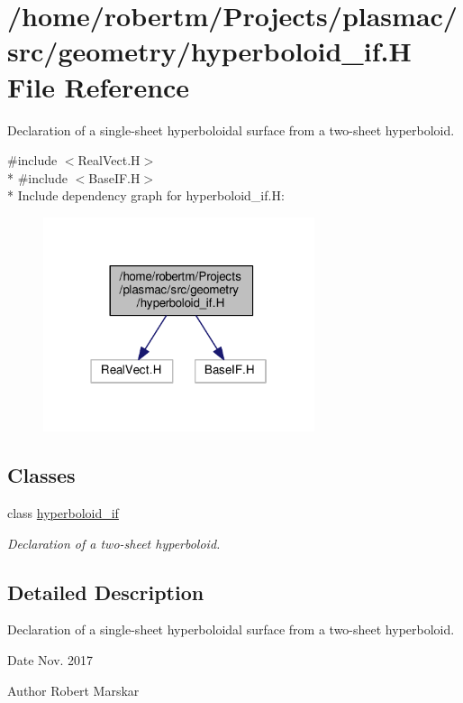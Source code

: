 \hypertarget{hyperboloid__if_8H}{}\section{/home/robertm/\+Projects/plasmac/src/geometry/hyperboloid\+\_\+if.H File Reference}
\label{hyperboloid__if_8H}


Declaration of a single-\/sheet hyperboloidal surface from a two-\/sheet hyperboloid.  


{\ttfamily \#include $<$Real\+Vect.\+H$>$}\\*
{\ttfamily \#include $<$Base\+I\+F.\+H$>$}\\*
Include dependency graph for hyperboloid\+\_\+if.\+H\+:\nopagebreak
\begin{figure}[H]
\begin{center}
\leavevmode
\includegraphics[width=226pt]{hyperboloid__if_8H__incl}
\end{center}
\end{figure}
\subsection*{Classes}
\begin{DoxyCompactItemize}
\item 
class \hyperlink{classhyperboloid__if}{hyperboloid\+\_\+if}
\begin{DoxyCompactList}\small\item\em Declaration of a two-\/sheet hyperboloid. \end{DoxyCompactList}\end{DoxyCompactItemize}


\subsection{Detailed Description}
Declaration of a single-\/sheet hyperboloidal surface from a two-\/sheet hyperboloid. 

\begin{DoxyDate}{Date}
Nov. 2017 
\end{DoxyDate}
\begin{DoxyAuthor}{Author}
Robert Marskar 
\end{DoxyAuthor}
